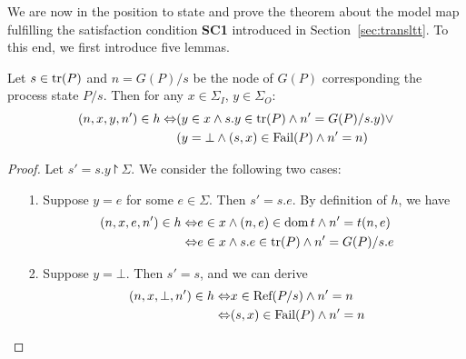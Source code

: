 We are now in the position to state and prove the theorem about the model map 
fulfilling the satisfaction condition {\bf SC1} introduced in Section~\ref{sec:transltt}. To this end, we first introduce five lemmas.


\begin{lemma}\label{tran}
Let $s\in \text{tr}(P)$ and $n=G(P)/s$ be the node of $G(P)$ corresponding the process state $P/s$. 
Then for any $x\in \Sigma_I$, $y\in \Sigma_O\colon$ 
\begin{align*}(n,x,y,n')\in h\Leftrightarrow &(y\in x\wedge s.y\in \text{tr}(P)\wedge n'=G(P)/s.y)\vee\\ &(y=\bot \wedge (s,x)\in {\text {\rm Fail}}(P)\wedge n'=n)\end{align*} 
\end{lemma}

\begin{proof}
Let $s'=s.y\project \Sigma$.
We consider the following two cases:
\begin{itemize}
\item[1.] Suppose $y=e$ for some $e\in \Sigma$. Then $s'=s.e$. By definition of $h$, we have  
\begin{align*}(n,x,e,n')\in h\Leftrightarrow & e\in x\wedge (n,e)\in {\text{\rm dom}}\, t\wedge n'=t(n,e)\\ \Leftrightarrow& e\in x\wedge s.e\in \text{tr}(P)\wedge n'=G(P)/s.e\end{align*} 
\item[2.] Suppose $y=\bot$. Then $s'=s$, and we can derive 
\begin{align*}(n,x,\bot,n')\in h\Leftrightarrow & x \in {\text {\rm Ref}}(P/s)\wedge n'=n \\
\Leftrightarrow & (s,x) \in {\text {\rm Fail}}(P)\wedge n'=n\end{align*} 
\end{itemize} 
\xbox
\end{proof}


